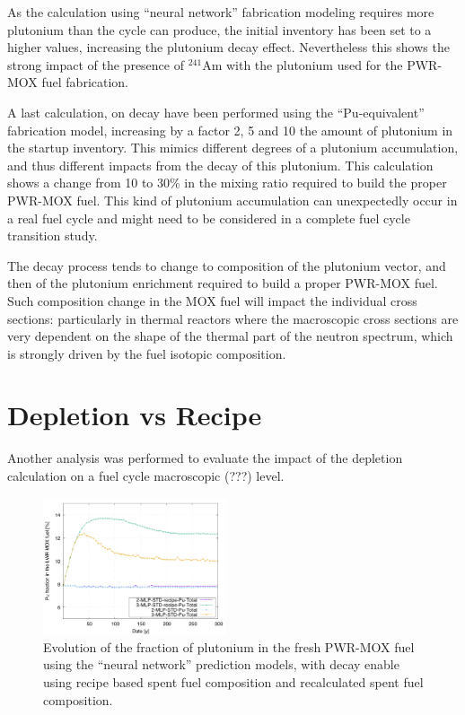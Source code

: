 \documentclass{anstrans}
\begin{document}

As the calculation using ``neural network'' fabrication modeling requires more
plutonium than the cycle can produce, the initial inventory has been set to a
higher values, increasing the plutonium decay effect. Nevertheless this shows
the strong impact of the presence of $^{241}$Am with the plutonium used for the
PWR-MOX fuel fabrication.


A last calculation, on decay have been performed using the ``Pu-equivalent''
fabrication model, increasing by a factor 2, 5 and 10 the amount of plutonium in
the startup inventory.  This mimics different degrees of a plutonium accumulation,
and thus different impacts from the decay of this plutonium.
This calculation shows a change from 10 to 30\% in the mixing ratio required to
build the proper PWR-MOX fuel. This kind of plutonium accumulation can
unexpectedly occur in a real fuel cycle and might need to be considered in a
complete fuel cycle transition study.


The decay process tends to change to composition of the plutonium vector, and
then of the plutonium enrichment required to build a proper PWR-MOX fuel.  Such
composition change in the MOX fuel will impact the individual cross sections:
particularly in thermal reactors where the macroscopic cross sections are very
dependent on the shape of the thermal part of the neutron spectrum, which is
strongly driven by the fuel isotopic composition.


\section{Depletion vs Recipe}

Another analysis was performed to evaluate the impact of the depletion
calculation on a fuel cycle macroscopic (???) level.

\begin{figure}[ht] %
  \centering
  \includegraphics[width=0.48\textwidth]{irradiation_pu_contribution.png}
  \caption{Evolution of the fraction of plutonium in the fresh PWR-MOX fuel
  using the ``neural network'' prediction models, with decay enable using recipe
based spent fuel composition and recalculated spent fuel composition.}
  \label{fig:depletion}
\end{figure}
\end{document}
